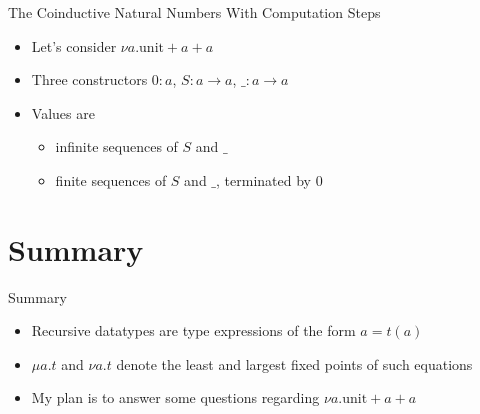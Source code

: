 \documentclass{beamer}
\newcommand{\arr}{\rightarrow}
\begin{document}
\begin{frame}{The Coinductive Natural Numbers With Computation Steps}

  \begin{itemize}
    \item
      Let's consider $\nu a . \text{unit} + a + a$
    \item
      Three constructors $0 : a$, $S : a \arr a$, $\_ : a \arr a$
    \item
      Values are
      \begin{itemize}
        \item infinite sequences of $S$ and $\_$
        \item finite sequences of $S$ and $\_$, terminated by $0$
      \end{itemize}
  \end{itemize}

  \begin{center}
  \end{center}

\end{frame}


\section*{Summary}

\begin{frame}{Summary}

  \begin{itemize}
  \item
    Recursive datatypes are type expressions of the form $a = t(a)$
  \item
    $\mu a . t$ and $\nu a . t$ denote the least and largest fixed points of such equations
  \item
    My plan is to answer some questions regarding $\nu a . \text{unit} + a + a$
  \end{itemize}

\end{frame}
\end{document}
